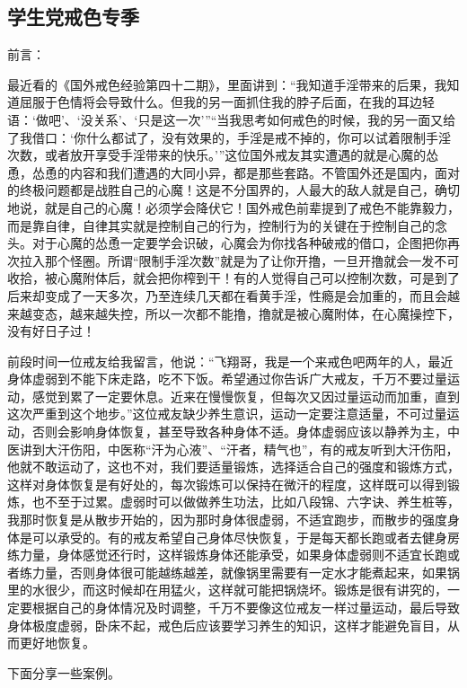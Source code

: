 \subsection{学生党戒色专季}

前言：

最近看的《国外戒色经验第四十二期》，里面讲到：“我知道手淫带来的后果，我知道屈服于色情将会导致什么。但我的另一面抓住我的脖子后面，在我的耳边轻语：‘做吧’、‘没关系’、‘只是这一次’”“当我思考如何戒色的时候，我的另一面又给了我借口：‘你什么都试了，没有效果的，手淫是戒不掉的，你可以试着限制手淫次数，或者放开享受手淫带来的快乐。’”这位国外戒友其实遭遇的就是心魔的怂恿，怂恿的内容和我们遭遇的大同小异，都是那些套路。不管国外还是国内，面对的终极问题都是战胜自己的心魔！这是不分国界的，人最大的敌人就是自己，确切地说，就是自己的心魔！必须学会降伏它！国外戒色前辈提到了戒色不能靠毅力，而是靠自律，自律其实就是控制自己的行为，控制行为的关键在于控制自己的念头。对于心魔的怂恿一定要学会识破，心魔会为你找各种破戒的借口，企图把你再次拉入那个怪圈。所谓“限制手淫次数”就是为了让你开撸，一旦开撸就会一发不可收拾，被心魔附体后，就会把你榨到干！有的人觉得自己可以控制次数，可是到了后来却变成了一天多次，乃至连续几天都在看黄手淫，性瘾是会加重的，而且会越来越变态，越来越失控，所以一次都不能撸，撸就是被心魔附体，在心魔操控下，没有好日子过！

前段时间一位戒友给我留言，他说：“飞翔哥，我是一个来戒色吧两年的人，最近身体虚弱到不能下床走路，吃不下饭。希望通过你告诉广大戒友，千万不要过量运动，感觉到累了一定要休息。近来在慢慢恢复，但每次又因过量运动而加重，直到这次严重到这个地步。”这位戒友缺少养生意识，运动一定要注意适量，不可过量运动，否则会影响身体恢复，甚至导致各种身体不适。身体虚弱应该以静养为主，中医讲到大汗伤阳，中医称“汗为心液”、“汗者，精气也”，有的戒友听到大汗伤阳，他就不敢运动了，这也不对，我们要适量锻炼，选择适合自己的强度和锻炼方式，这样对身体恢复是有好处的，每次锻炼可以保持在微汗的程度，这样既可以得到锻炼，也不至于过累。虚弱时可以做做养生功法，比如八段锦、六字诀、养生桩等，我那时恢复是从散步开始的，因为那时身体很虚弱，不适宜跑步，而散步的强度身体是可以承受的。有的戒友希望自己身体尽快恢复，于是每天都长跑或者去健身房练力量，身体感觉还行时，这样锻炼身体还能承受，如果身体虚弱则不适宜长跑或者练力量，否则身体很可能越练越差，就像锅里需要有一定水才能煮起来，如果锅里的水很少，而这时候却在用猛火，这样就可能把锅烧坏。锻炼是很有讲究的，一定要根据自己的身体情况及时调整，千万不要像这位戒友一样过量运动，最后导致身体极度虚弱，卧床不起，戒色后应该要学习养生的知识，这样才能避免盲目，从而更好地恢复。

下面分享一些案例。

